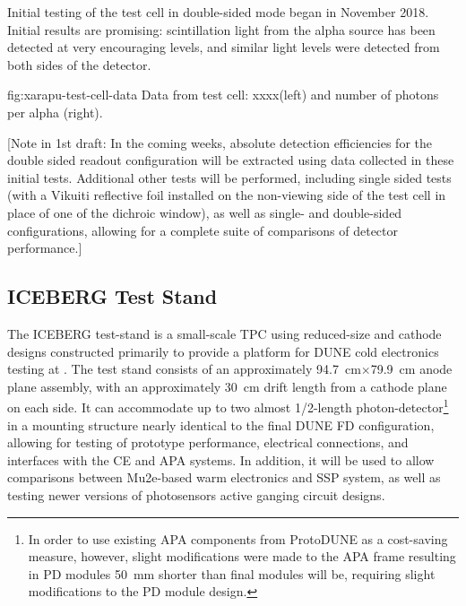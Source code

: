 Initial testing of the test cell in double-sided  mode began in November 2018.  Initial results are promising:  scintillation light from the alpha source has been detected at very encouraging levels, and similar light levels were detected from both sides of the detector.


\begin{dunefigure}{fig:xarapu-test-cell-data}
{Data from  test cell: xxxx(left) and number of photons per alpha (right).} 
\end{dunefigure}


[Note in 1st draft:  In the coming weeks, absolute detection efficiencies for the double sided readout  configuration will be extracted using data collected in these initial tests.  Additional other tests will be performed, including single sided  tests (with a Vikuiti reflective foil installed on the non-viewing side of the test cell in place of one of the dichroic window), as well as single- and double-sided  configurations, allowing for a complete suite of comparisons of detector performance.]



% 

\subsection{ICEBERG Test Stand}
\label{sec:iceberg-teststand}

The ICEBERG test-stand is a small-scale TPC using reduced-size   and cathode designs constructed primarily to provide a platform for DUNE cold electronics testing at . 
The test stand consists of an approximately \SI{94.7}{cm}$\times$\SI{79.9}{cm} anode plane assembly, with an approximately \SI{30}{cm} drift length from a cathode plane on each side.  
It can accommodate up to two almost 1/2-length photon-detector\footnote{In order to use existing APA components from ProtoDUNE as a cost-saving measure, however, slight modifications were made to the APA frame resulting in PD modules \SI{50}{mm} shorter than final modules will be, requiring slight modifications to the PD module design.} in a mounting structure nearly identical to the final DUNE FD configuration, allowing for testing of  prototype performance, electrical connections, and interfaces with the CE and APA systems. 
In addition, it will be used to allow comparisons between Mu2e-based warm electronics and  SSP system, as well as testing newer versions of photosensors active ganging circuit designs.

